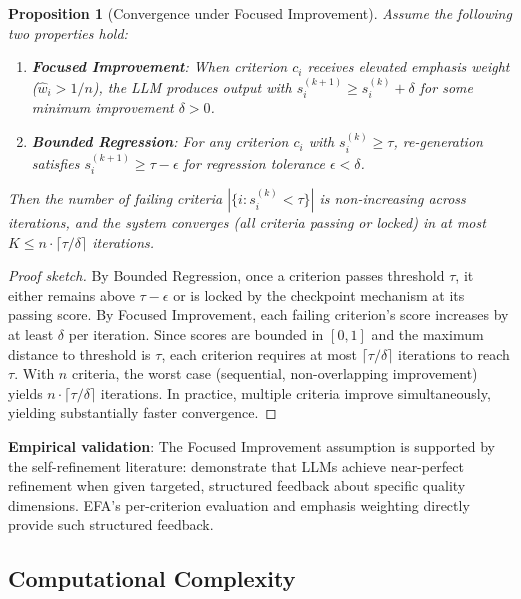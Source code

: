\documentclass[11pt]{article}
\newtheorem{proposition}{Proposition}
\newcommand{\efa}{\textsc{EFA}}  %
\begin{document}
\begin{proposition}[Convergence under Focused Improvement]
\label{prop:convergence}
Assume the following two properties hold:
\begin{enumerate}
    \item \textbf{Focused Improvement}: When criterion $c_i$ receives elevated emphasis weight ($\hat{w}_i > 1/n$), the LLM produces output with $s_i^{(k+1)} \geq s_i^{(k)} + \delta$ for some minimum improvement $\delta > 0$.
    \item \textbf{Bounded Regression}: For any criterion $c_i$ with $s_i^{(k)} \geq \tau$, re-generation satisfies $s_i^{(k+1)} \geq \tau - \epsilon$ for regression tolerance $\epsilon < \delta$.
\end{enumerate}
Then the number of failing criteria $|\{i : s_i^{(k)} < \tau\}|$ is non-increasing across iterations, and the system converges (all criteria passing or locked) in at most $K \leq n \cdot \lceil \tau / \delta \rceil$ iterations.
\end{proposition}

\begin{proof}[Proof sketch]
By Bounded Regression, once a criterion passes threshold $\tau$, it either remains above $\tau - \epsilon$ or is locked by the checkpoint mechanism at its passing score. By Focused Improvement, each failing criterion's score increases by at least $\delta$ per iteration. Since scores are bounded in $[0, 1]$ and the maximum distance to threshold is $\tau$, each criterion requires at most $\lceil \tau / \delta \rceil$ iterations to reach $\tau$. With $n$ criteria, the worst case (sequential, non-overlapping improvement) yields $n \cdot \lceil \tau / \delta \rceil$ iterations. In practice, multiple criteria improve simultaneously, yielding substantially faster convergence.
\end{proof}

\textbf{Empirical validation}: The Focused Improvement assumption is supported by the self-refinement literature: \citet{lee2025refinebench} demonstrate that LLMs achieve near-perfect refinement when given targeted, structured feedback about specific quality dimensions. \efa{}'s per-criterion evaluation and emphasis weighting directly provide such structured feedback.

\subsection{Computational Complexity}
\label{sec:complexity}
\end{document}
